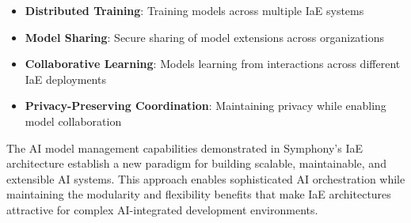\begin{itemize}
    \item \textbf{Distributed Training}: Training models across multiple IaE systems
    \item \textbf{Model Sharing}: Secure sharing of model extensions across organizations
    \item \textbf{Collaborative Learning}: Models learning from interactions across different IaE deployments
    \item \textbf{Privacy-Preserving Coordination}: Maintaining privacy while enabling model collaboration
\end{itemize}

The AI model management capabilities demonstrated in Symphony's IaE architecture establish a new paradigm for building scalable, maintainable, and extensible AI systems. This approach enables sophisticated AI orchestration while maintaining the modularity and flexibility benefits that make IaE architectures attractive for complex AI-integrated development environments.
